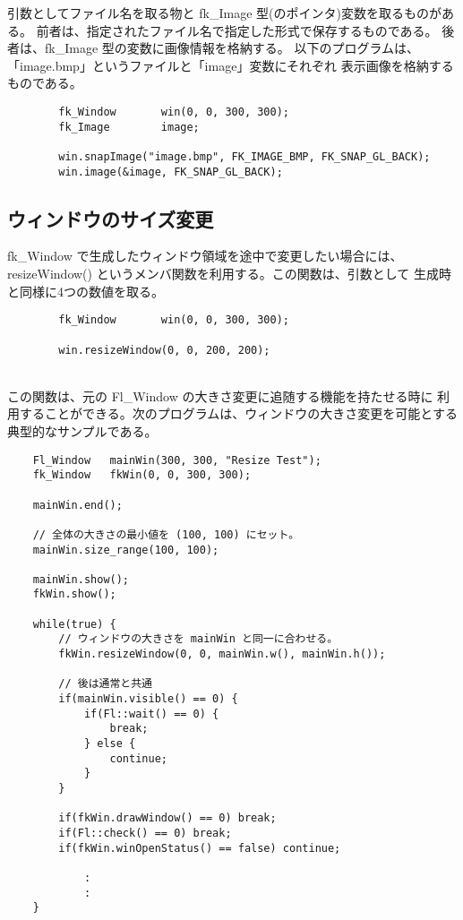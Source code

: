引数としてファイル名を取る物と fk\_Image 型(のポインタ)変数を取るものがある。
前者は、指定されたファイル名で指定した形式で保存するものである。
後者は、fk\_Image 型の変数に画像情報を格納する。
以下のプログラムは、「image.bmp」というファイルと「image」変数にそれぞれ
表示画像を格納するものである。
\\
\begin{screen}
\begin{verbatim}
        fk_Window       win(0, 0, 300, 300);
        fk_Image        image;

        win.snapImage("image.bmp", FK_IMAGE_BMP, FK_SNAP_GL_BACK);
        win.image(&image, FK_SNAP_GL_BACK);
\end{verbatim}
\end{screen}

\subsection{ウィンドウのサイズ変更}
fk\_Window で生成したウィンドウ領域を途中で変更したい場合には、
resizeWindow() というメンバ関数を利用する。この関数は、引数として
生成時と同様に4つの数値を取る。
\\
\begin{screen}
\begin{verbatim}
        fk_Window       win(0, 0, 300, 300);

        win.resizeWindow(0, 0, 200, 200);
\end{verbatim}
\end{screen}
~ \\
この関数は、元の Fl\_Window の大きさ変更に追随する機能を持たせる時に
利用することができる。次のプログラムは、ウィンドウの大きさ変更を可能とする
典型的なサンプルである。
\\
\begin{breakbox}
\begin{verbatim}
    Fl_Window   mainWin(300, 300, "Resize Test");
    fk_Window   fkWin(0, 0, 300, 300);

    mainWin.end();

    // 全体の大きさの最小値を (100, 100) にセット。
    mainWin.size_range(100, 100);

    mainWin.show();
    fkWin.show();

    while(true) {
        // ウィンドウの大きさを mainWin と同一に合わせる。        
        fkWin.resizeWindow(0, 0, mainWin.w(), mainWin.h());

        // 後は通常と共通
        if(mainWin.visible() == 0) {
            if(Fl::wait() == 0) {
                break;
            } else {
                continue;
            }
        }

        if(fkWin.drawWindow() == 0) break;
        if(Fl::check() == 0) break;
        if(fkWin.winOpenStatus() == false) continue;

            :
            :
    }
\end{verbatim}
\end{breakbox}


